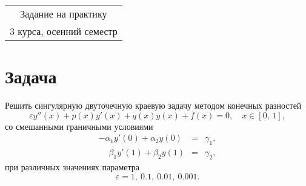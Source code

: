 \documentclass[a4paper,final,12pt]{article}
\begin{document}
\begin{center}
	\Large\bf\em 
	\begin{tabular}{c}
		Задание на практику \\
		3 курса, осенний семестр
	\end{tabular}
\end{center}

	
	
\section*{Задача}
Решить сингулярную двуточечную краевую задачу методом конечных разностей
$$
\varepsilon y''(x) + p(x)y'(x) + q(x)y(x) + f(x) = 0,\quad x\in[0,\,1],
$$
со смешанными граничными условиями
$$
\begin{array}{rcl}
-\alpha_1y'(0) + \alpha_2y(0)			&=&	\gamma_1,\\[8pt]
\phantom{-}\beta_1y'(1) + \beta_2y(1)	&=&	\gamma_2,
\end{array}
$$
при различных значениях параметра 
$$
\varepsilon=1,~0.1,~0.01,~0.001.
$$
\end{document}
